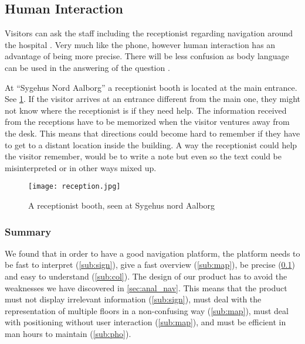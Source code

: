\subsection{Human Interaction}\label{sub:human}
Visitors can ask the staff including the receptionist regarding navigation around the hospital \cite{job}. Very much like the phone, however human interaction has an advantage of being more precise. There will be less confusion as body language can be used in the answering of the question \cite{body_vs_phone}.

At \enquote{Sygehus Nord Aalborg} a receptionist booth is located at the main entrance. See \cref{fig:rec_booth}. If the visitor arrives at an entrance different from the main one, they might not know where the receptionist is if they need help. The information received from the receptions have to be memorized when the visitor ventures away from the desk. This means that directions could become hard to remember if they have to get to a distant location inside the building. A way the receptionist could help the visitor remember, would be to write a note but even so the text could be misinterpreted or in other ways mixed up.

  \begin{figure}[ht!]
    \centering
    \texttt{[image: reception.jpg]}
    \caption{A receptionist booth, seen at Sygehus nord Aalborg}
    \label{fig:rec_booth}
  \end{figure}

\subsubsection{Summary} %
  We found that in order to have a good navigation platform, the platform needs to be fast to interpret (\cref{sub:sign}), give a fast overview (\cref{sub:map}), be precise (\cref{sub:human}) and easy to understand (\cref{sub:col}). The design of our product has to avoid the weaknesses we have discovered in \cref{sec:anal_nav}. This means that the product must not display irrelevant information (\cref{sub:sign}), must deal with the representation of multiple floors in a non-confusing way (\cref{sub:map}), must deal with positioning without user interaction (\cref{sub:map}), and must be efficient in man hours to maintain (\cref{sub:pho}).